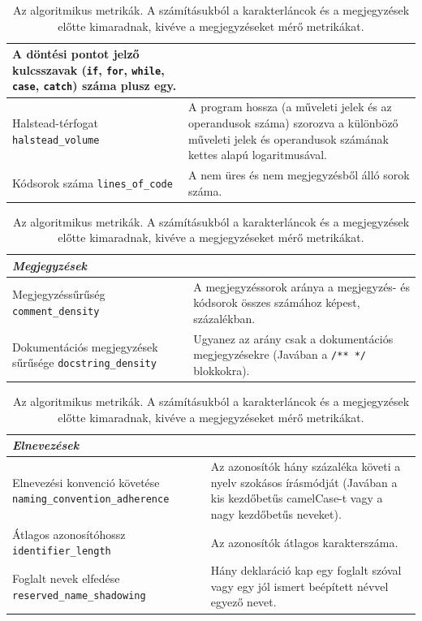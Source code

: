 \documentclass[
]{elteikthesis}[2024/04/26]
\begin{document}
\begin{table}[htb]
\begin{tabular}{ | p{5.6cm} | p{7.8cm} | }
		A döntési pontot jelző kulcsszavak (\texttt{if}, \texttt{for},
		\texttt{while}, \texttt{case}, \texttt{catch}) száma plusz egy. \\
		\hline
		Halstead-térfogat \newline \texttt{halstead\_volume} &
		A program hossza (a műveleti jelek és az operandusok száma) szorozva a
		különböző műveleti jelek és operandusok számának kettes alapú
		logaritmusával. \\
		\hline
		Kódsorok száma \newline \texttt{lines\_of\_code} &
		A nem üres és nem megjegyzésből álló sorok száma. \\
		\hline
	\end{tabular}\par\medskip
	\begin{tabular}{ | p{5.6cm} | p{7.8cm} | }
		\hline
		\multicolumn{2}{|l|}{\textit{Megjegyzések}} \\
		\hline
		Megjegyzéssűrűség \newline \texttt{comment\_density} &
		A megjegyzéssorok aránya a megjegyzés- és kódsorok összes számához képest,
		százalékban. \\
		\hline
		Dokumentációs megjegyzések sűrűsége \newline \texttt{docstring\_density} &
		Ugyanez az arány csak a dokumentációs megjegyzésekre (Javában a
		\texttt{/** */} blokkokra). \\
		\hline
	\end{tabular}\par\medskip
	\begin{tabular}{ | p{5.6cm} | p{7.8cm} | }
		\hline
		\multicolumn{2}{|l|}{\textit{Elnevezések}} \\
		\hline
		Elnevezési konvenció követése \newline \texttt{naming\_convention\_adherence} &
		Az azonosítók hány százaléka követi a nyelv szokásos írásmódját (Javában a
		kis kezdőbetűs camelCase-t vagy a nagy kezdőbetűs neveket). \\
		\hline
		Átlagos azonosítóhossz \newline \texttt{identifier\_length} &
		Az azonosítók átlagos karakterszáma. \\
		\hline
		Foglalt nevek elfedése \newline \texttt{reserved\_name\_shadowing} &
		Hány deklaráció kap egy foglalt szóval vagy egy jól ismert beépített névvel
		egyező nevet. \\
		\hline
	\end{tabular}
	\caption[Az algoritmikus metrikák]{Az algoritmikus metrikák. A
	számításukból a karakterláncok és a megjegyzések előtte kimaradnak, kivéve a
	megjegyzéseket mérő metrikákat.}
	\label{tab:method:algmetrics}
\end{table}
\end{document}
